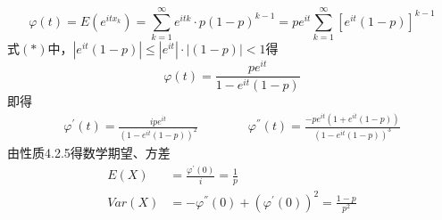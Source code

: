 \documentclass[a4paper]{ctexart}    %
\begin{document}
	\begin{equation}
		\varphi (t) = E(e^{itx_k}) = \sum\limits_{k=1}^{\infty} e^{itk} \cdot p(1-p)^{k-1}
		= pe^{it}\sum\limits_{k=1}^{\infty}\left[e^{it}(1-p)\right]^{k-1}\tag{$*$}
	\end{equation}
	式$(*)$中，$\left|e^{it}(1-p)\right| \leq \left|e^{it}\right| \cdot \left|(1-p)\right| < 1$得
	\begin{equation*}
		\varphi (t) = \frac{pe^{it}}{1-e^{it}(1-p)}
	\end{equation*}
	即得
	\begin{equation*}
		\begin{split}
			\varphi^{'}(t) = \frac{ipe^{it}}{(1-e^{it}(1-p))^2}\qquad\qquad
			\varphi^{''}(t) = \frac{-pe^{it}(1+e^{it}(1-p))}{(1-e^{it}(1-p))^3}
		\end{split}
	\end{equation*}
	由性质4.2.5得数学期望、方差
	\begin{equation*}
		\begin{split}
			E(X) &= \frac{\varphi^{'}(0)}{i} = \frac{1}{p} \\
			Var(X) &= -\varphi^{''}(0) + (\varphi^{'}(0))^2 = \frac{1-p}{p^2}
		\end{split}
	\end{equation*}
\end{document}
